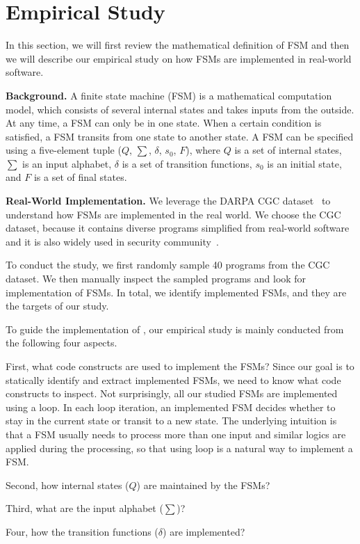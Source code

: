 \section{Empirical Study}
In this section, we will first review the mathematical definition of FSM and then 
we will describe our empirical study on how FSMs are implemented 
in real-world software. 

\noindent\textbf{Background.}
A finite state machine (FSM) is a mathematical computation model, 
which consists of several internal states and takes inputs from the outside.
At any time, a FSM can only be in one state. 
When a certain condition is satisfied, 
a FSM transits from one state to another state. 
A FSM can be specified using a five-element tuple ($Q$, $\sum$, $\delta$, $s_0$, $F$),
where $Q$ is a set of internal states, $\sum$ is an input alphabet, 
$\delta$ is a set of transition functions,
$s_0$ is an initial state, and $F$ is a set of final states. 

\noindent\textbf{Real-World Implementation.}
We leverage the DARPA CGC dataset~\cite{CGC} to 
understand how FSMs are implemented in the real world. 
We choose the CGC dataset, because it 
contains diverse programs simplified 
from real-world software and it is also widely used in security 
community~\cite{QSYM, Driller, VUzzer}. 


To conduct the study, we first randomly sample 
40 programs from the CGC dataset.
We then manually inspect the sampled programs and look for implementation of FSMs.
In total, we identify {\color{red}{XXX}} implemented FSMs, 
and they are the targets of our study.

To guide the implementation of \Tool{}, our empirical study 
is mainly conducted from the following four aspects. 

First, what code constructs are used to implement the FSMs?
Since our goal is to statically identify and extract implemented FSMs, 
we need to know what code constructs to inspect. 
Not surprisingly, all our studied FSMs are implemented using a loop. 
In each loop iteration, an implemented FSM 
decides whether to stay in the current state or transit to a new state. 
The underlying intuition is that a FSM usually needs to process 
more than one input and similar logics are applied during the processing, 
so that using loop is a natural way to implement a FSM. 

Second, how internal states ($Q$) are maintained by the FSMs?

Third, what are the input alphabet ($\sum$)? 

Four, how the transition functions ($\delta$) are implemented?

